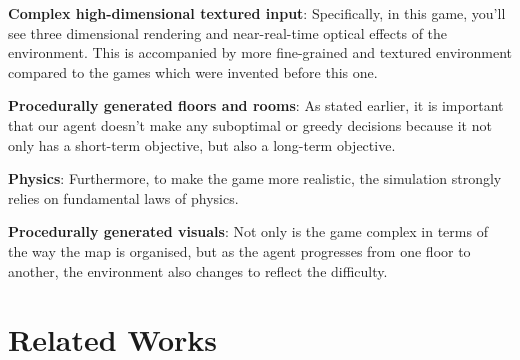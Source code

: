 \documentclass[conference]{IEEEtran}
\begin{document}
\textbf{Complex high-dimensional textured input}: Specifically, in this game, you'll see three dimensional rendering and near-real-time optical effects of the environment. This is accompanied by more fine-grained and textured environment compared to the games which were invented before this one.

\textbf{Procedurally generated floors and rooms}: As stated earlier, it is important that our agent doesn't make any suboptimal or greedy decisions because it not only has a short-term objective, but also a long-term objective.

\textbf{Physics}: Furthermore, to make the game more realistic, the simulation strongly relies on fundamental laws of physics. 

\textbf{Procedurally generated visuals}: Not only is the game complex in terms of the way the map is organised, but as the agent progresses from one floor to another, the environment also changes to reflect the difficulty.

\section{Related Works}
\end{document}
